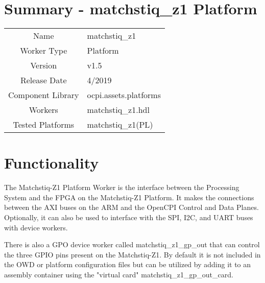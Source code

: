 \documentclass{article}
\author{} %
\date{Version \docVersion} %
\title{\docTitle}
\def\docVersion{1.5}
\def\comp{matchstiq\_z1}
\def\Comp{matchstiq\_z1 Platform}
\begin{document}
\section*{Summary - \Comp}
\begin{tabular}{|c|M{13.5cm}|}
	\hline
	                  &                                                    \\
	\hline
	Name              & \comp                                              \\
	\hline
	Worker Type       & Platform                                           \\
	\hline
	Version           & v\docVersion \\
	\hline
	Release Date      & 4/2019 \\
	\hline
	Component Library & ocpi.assets.platforms \\
	\hline
	Workers & \comp.hdl \\
	\hline
	Tested Platforms  & matchstiq\_z1(PL) \\
	\hline
\end{tabular}

\section*{Functionality}
\begin{flushleft}
The Matchstiq-Z1 Platform Worker is the interface between the Processing System and the FPGA on the Matchstiq-Z1 Platform. It makes the connections between the AXI buses on the ARM and the OpenCPI Control and Data Planes. Optionally, it can also be used to interface with the SPI, I2C, and UART buses with device workers. \newline

There is also a GPO device worker called matchstiq\_z1\_gp\_out that can control the three GPIO pins present on the Matchstiq-Z1. By default it is not included in the OWD or platform configuration files but can be utilized by adding it to an assembly container using the "virtual card" matchstiq\_z1\_gp\_out\_card. 

\end{flushleft}
\end{document}

